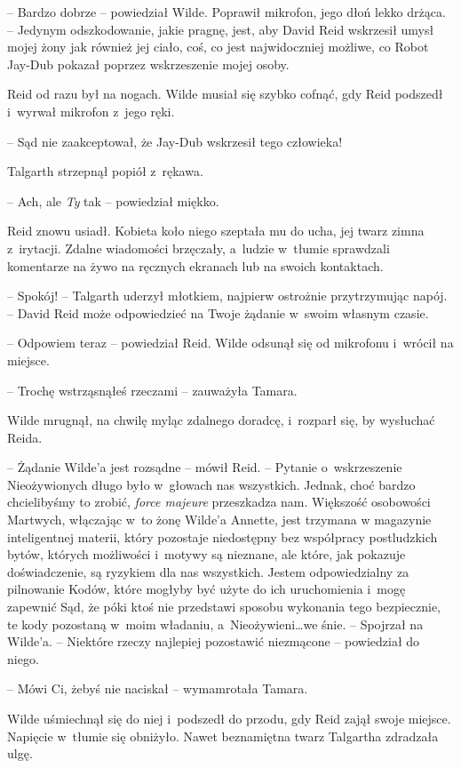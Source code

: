 \documentclass[oneside,polish,11pt,sfheadings]{mwbk}
\begin{document}
-- Bardzo dobrze -- powiedział Wilde. Poprawił mikrofon, jego dłoń lekko
drżąca. -- Jedynym odszkodowanie, jakie pragnę, jest, aby David Reid
wskrzesił umysł mojej żony jak również jej ciało, coś, co jest
najwidoczniej możliwe, co Robot Jay-Dub pokazał poprzez wskrzeszenie
mojej osoby.

Reid od razu był na nogach. Wilde musiał się szybko cofnąć, gdy Reid
podszedł i~wyrwał mikrofon z~jego ręki.

-- Sąd nie zaakceptował, że Jay-Dub wskrzesił tego człowieka!

Talgarth strzepnął popiół z~rękawa. 

-- Ach, ale \emph{Ty} tak -- powiedział miękko.

Reid znowu usiadł. Kobieta koło niego szeptała mu do ucha, jej twarz
zimna z~irytacji. Zdalne wiadomości brzęczały, a~ludzie w~tłumie
sprawdzali komentarze na żywo na ręcznych ekranach lub na swoich
kontaktach.

-- Spokój! -- Talgarth uderzył młotkiem, najpierw ostrożnie przytrzymując
napój. -- David Reid może odpowiedzieć na Twoje żądanie w~swoim własnym
czasie.

-- Odpowiem teraz -- powiedział Reid. Wilde odsunął się od mikrofonu i~wrócił na miejsce.

-- Trochę wstrząsnąłeś rzeczami -- zauważyła Tamara.

Wilde mrugnął, na chwilę myląc zdalnego doradcę, i~rozparł się, by
wysłuchać Reida.

-- Żądanie Wilde'a jest rozsądne -- mówił Reid. -- Pytanie o~wskrzeszenie
Nieożywionych długo było w~głowach nas wszystkich. Jednak, choć bardzo
chcielibyśmy to zrobić, \emph{force majeure} przeszkadza nam. Większość
osobowości Martwych, włączając w~to żonę Wilde'a Annette, jest trzymana
w magazynie inteligentnej materii, który pozostaje niedostępny bez
współpracy postludzkich bytów, których możliwości i~motywy są nieznane,
ale które, jak pokazuje doświadczenie, są ryzykiem dla nas wszystkich.
Jestem odpowiedzialny za pilnowanie Kodów, które mogłyby być użyte do
ich uruchomienia i~mogę zapewnić Sąd, że póki ktoś nie przedstawi
sposobu wykonania tego bezpiecznie, te kody pozostaną w~moim władaniu, a~Nieożywieni\ldots we śnie. -- Spojrzał na Wilde'a. -- Niektóre rzeczy
najlepiej pozostawić niezmącone -- powiedział do niego.

-- Mówi Ci, żebyś nie naciskał -- wymamrotała Tamara.

Wilde uśmiechnął się do niej i~podszedł do przodu, gdy Reid zajął swoje
miejsce. Napięcie w~tłumie się obniżyło. Nawet beznamiętna twarz
Talgartha zdradzała ulgę.
\end{document}
